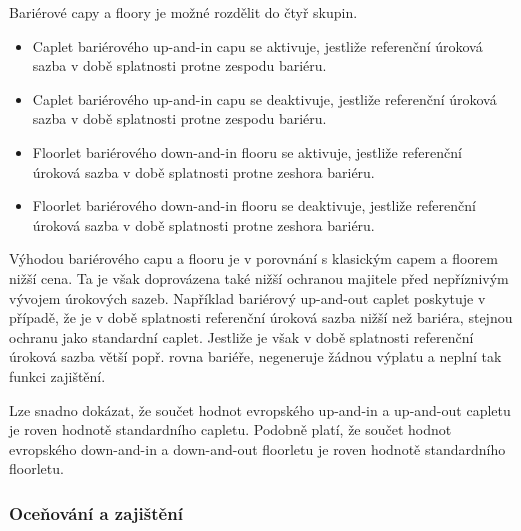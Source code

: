 \documentclass[a4paper]{book}
\begin{document}
Bariérové capy a floory je možné rozdělit do čtyř skupin.
\begin{itemize}
\item Caplet bariérového up-and-in capu se aktivuje, jestliže referenční úroková sazba v době splatnosti protne zespodu bariéru.
\item Caplet bariérového up-and-in capu se deaktivuje, jestliže referenční úroková sazba v době splatnosti protne zespodu bariéru.
\item Floorlet bariérového down-and-in flooru se aktivuje, jestliže referenční úroková sazba v době splatnosti protne zeshora bariéru.
\item Floorlet bariérového down-and-in flooru se deaktivuje, jestliže referenční úroková sazba v době splatnosti protne zeshora bariéru.
\end{itemize}
Výhodou bariérového capu a flooru je v porovnání s klasickým capem a floorem nižší cena. Ta je však doprovázena také nižší ochranou majitele před nepříznivým vývojem úrokových sazeb. Například bariérový up-and-out caplet poskytuje v případě, že je v době splatnosti referenční úroková sazba nižší než bariéra, stejnou ochranu jako standardní caplet. Jestliže je však v době splatnosti referenční úroková sazba větší popř. rovna bariéře, negeneruje žádnou výplatu a neplní tak funkci zajištění. 

Lze snadno dokázat, že součet hodnot evropského up-and-in a up-and-out capletu je roven hodnotě standardního capletu. Podobně platí, že součet hodnot evropského down-and-in a down-and-out floorletu je roven hodnotě standardního floorletu.

\subsubsection{Oceňování a zajištění}
\end{document}
